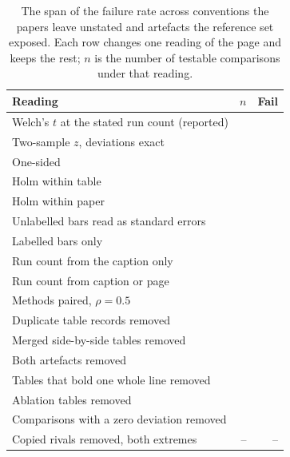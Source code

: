 \documentclass[sigconf,anonymous]{aamas}
\begin{document}
\begin{table}[t]
\caption{The span of the failure rate across conventions the papers leave
unstated and artefacts the reference set exposed. Each row changes one
reading of the page and keeps the rest; $n$ is the number of testable
comparisons under that reading.}
\label{tab:span}
\small
\begin{tabular}{@{}lrr@{}}
\toprule
Reading & $n$ & Fail \\
\midrule
Welch's $t$ at the stated run count (reported) & \nSpanAsReportedN{} & \nSpanAsReportedFail{} \\
Two-sample $z$, deviations exact & \nSpanZTwoSidedN{} & \nSpanZTwoSidedFail{} \\
One-sided & \nSpanOneSidedN{} & \nSpanOneSidedFail{} \\
Holm within table & \nSpanAsReportedN{} & \nSpanAsReportedFailHolm{} \\
Holm within paper & \nSpanHolmFamilyPaperN{} & \nSpanHolmFamilyPaperFailHolm{} \\
Unlabelled bars read as standard errors & \nSpanUnlabelledAsSemN{} & \nSpanUnlabelledAsSemFail{} \\
Labelled bars only & \nSpanLabelledOnlyN{} & \nSpanLabelledOnlyFail{} \\
Run count from the caption only & \nStrictN{} & \nStrictFail{} \\
Run count from caption or page & \nSpanCaptionOrPageN{} & \nSpanCaptionOrPageFail{} \\
Methods paired, $\rho = 0.5$ & \nSpanRhoHalfN{} & \nSpanRhoHalfFail{} \\
Duplicate table records removed & \nRDupRemovedTestableN{} & \nRDupRemovedFail{} \\
Merged side-by-side tables removed & \nRMergedRemovedTestableN{} & \nRMergedRemovedFail{} \\
Both artefacts removed & \nRArtefactsRemovedTestableN{} & \nRArtefactsRemovedFail{} \\
Tables that bold one whole line removed & \nROwnRowRemovedTestableN{} & \nROwnRowRemovedFail{} \\
Ablation tables removed & \nRAblationRemovedTestableN{} & \nRAblationRemovedFail{} \\
Comparisons with a zero deviation removed & \nRZeroRemovedTestableN{} & \nRZeroRemovedFail{} \\
Copied rivals removed, both extremes & -- & \nFailCopiedRemovedLow{}--\nFailCopiedRemovedHigh{} \\
\bottomrule
\end{tabular}
\end{table}
\end{document}
